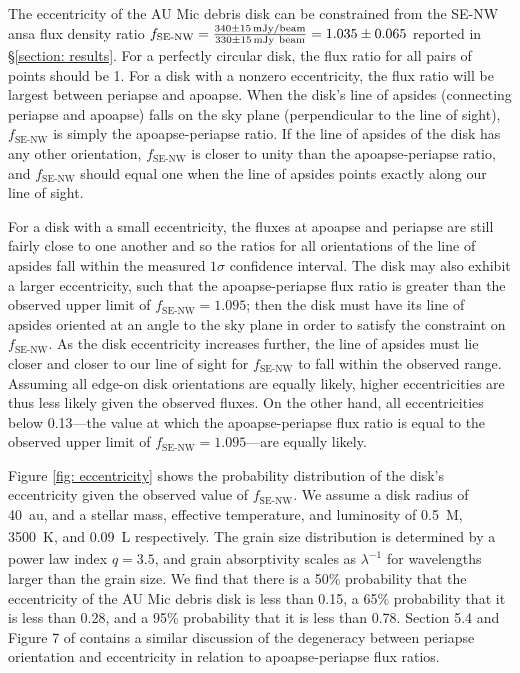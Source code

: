 \documentclass[modern]{aastex62}
\begin{document}
The eccentricity of the AU Mic debris disk can be constrained from the SE-NW ansa flux density ratio $f_{\text{SE-NW}} = \frac{\SI{340 \pm 15}{mJy / beam}}{\SI{330 \pm 15}{mJy \ beam}} = \num{1.035 \pm 0.065}$ reported in \S \ref{section: results}.
For a perfectly circular disk, the flux ratio for all pairs of points should be 1. 
For a disk with a nonzero eccentricity, the flux ratio will be largest between periapse and apoapse. 
When the disk's line of apsides (connecting periapse and apoapse) falls on the sky plane (perpendicular to the line of sight), $f_{\text{SE-NW}}$ is simply the apoapse-periapse ratio. 
If the line of apsides of the disk has any other orientation, $f_{\text{SE-NW}}$ is closer to unity than the apoapse-periapse ratio, and $f_{\text{SE-NW}}$ should equal one when the line of apsides points exactly along our line of sight.

For a disk with a small eccentricity, the fluxes at apoapse and periapse are still fairly close to one another and so the ratios for all orientations of the line of apsides fall within the measured $1\sigma$ confidence interval. 
The disk may also exhibit a larger eccentricity, such that the apoapse-periapse flux ratio is greater than the observed upper limit of $f_{\text{SE-NW}}=1.095$; then the disk must have its line of apsides oriented at an angle to the sky plane in order to satisfy the constraint on $f_{\text{SE-NW}}$. 
As the disk eccentricity increases further, the line of apsides must lie closer and closer to our line of sight for $f_{\text{SE-NW}}$ to fall within the observed range.
Assuming all edge-on disk orientations are equally likely, higher eccentricities are thus less likely given the observed fluxes. 
On the other hand, all eccentricities below 0.13---the value at which the apoapse-periapse flux ratio is equal to the observed upper limit of $f_{\text{SE-NW}}=1.095$---are equally likely. 

Figure \ref{fig: eccentricity} shows the probability distribution of the disk's eccentricity given the observed value of $f_{\text{SE-NW}}$.
We assume a disk radius of \SI{40}{au}, and a stellar mass, effective temperature, and luminosity of \SI{0.5}{M_\sun}, \SI{3500}{K}, and \SI{0.09}{L_\sun} respectively. 
The grain size distribution is determined by a power law index $q=3.5$, and grain absorptivity scales as $\lambda^{-1}$ for wavelengths larger than the grain size.
We find that there is a 50\% probability that the eccentricity of the AU Mic debris disk is less than 0.15, a 65\% probability that it is less than 0.28, and a 95\% probability that it is less than 0.78.
Section 5.4 and Figure 7 of \citet{wyatt99} contains a similar discussion of the degeneracy between periapse orientation and eccentricity in relation to apoapse-periapse flux ratios.
\end{document}

